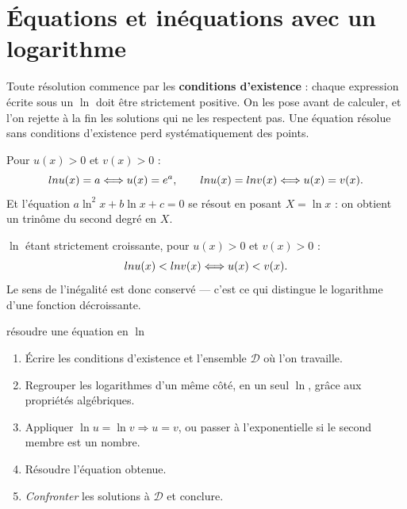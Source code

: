 \section{Équations et inéquations avec un logarithme}

\begin{avertissement}
Toute résolution commence par les \textbf{conditions d'existence} : chaque
expression écrite sous un $\ln$ doit être strictement positive. On les pose
avant de calculer, et l'on rejette à la fin les solutions qui ne les
respectent pas. Une équation résolue sans conditions d'existence perd
systématiquement des points.
\end{avertissement}

\begin{theoreme}
Pour $u(x)>0$ et $v(x)>0$ :
\[
  ln u(x) = a \Longleftrightarrow u(x) = e^{a}, \qquad
  ln u(x) = ln v(x) \Longleftrightarrow u(x) = v(x).
\]
Et l'équation $a\ln^{2}x+b\ln x+c = 0$ se résout en posant $X = \ln x$ : on
obtient un trinôme du second degré en $X$.
\end{theoreme}

\begin{propriete}[inéquations]
$\ln$ étant strictement croissante, pour $u(x)>0$ et $v(x)>0$ :
\[
  ln u(x) < ln v(x) \Longleftrightarrow u(x) < v(x).
\]
Le sens de l'inégalité est donc conservé — c'est ce qui distingue le
logarithme d'une fonction décroissante.
\end{propriete}

\begin{methode}{résoudre une équation en $\ln$}
\begin{enumerate}[label=\textbf{\arabic*.}, leftmargin=*, itemsep=0.15em]
  \item Écrire les conditions d'existence et l'ensemble $\mathcal D$ où l'on
        travaille.
  \item Regrouper les logarithmes d'un même côté, en un seul $\ln$, grâce
        aux propriétés algébriques.
  \item Appliquer $\ln u = \ln v \Rightarrow u = v$, ou passer à
        l'exponentielle si le second membre est un nombre.
  \item Résoudre l'équation obtenue.
  \item \emph{Confronter} les solutions à $\mathcal D$ et conclure.
\end{enumerate}
\end{methode}

